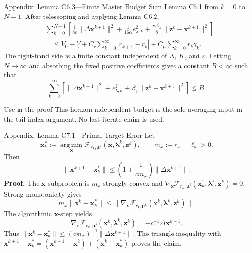 \documentclass[handout,compress,9pt]{beamer}
\newcommand{\bx}{\bm{x}}
\newcommand{\bz}{\bm{z}}
\newcommand{\bmu}{\bm{\mu}}
\newcommand{\blmbd}{\bm{\lambda}}
\newcommand{\eps}{\varepsilon}
\begin{document}
\begin{frame}{Appendix: Lemma C6.3---Finite Master Budget
\hfill\hyperlink{appendix:contents}{}}
\scriptsize
Sum Lemma C6.1 from $k=0$ to $N-1$.  After telescoping and applying
Lemma C6.2,
\begin{equation*}
\begin{aligned}
  &\sum_{k=0}^{N-1}\left[
  \frac1{8c}\|\Delta\bx^{k+1}\|^2
  +\frac1{16\alpha}e_{\lambda,k}^2
  +\frac{r_x\beta_k}{8}\|\bz^k-\bx^{k+1}\|^2\right]\\
  &\quad\le V_0-\underline V
  +C_r\sum_{k=0}^{\infty}|r_{k+1}-r_k|
  +C_\mu\sum_{k=0}^{\infty}r_k\gamma_k.
\end{aligned}
\end{equation*}
The right-hand side is a finite constant independent of $N$, $K$, and
$\eps$.  Letting $N\to\infty$ and absorbing the fixed positive coefficients
gives a constant $B<\infty$ such that
\begin{equation*}
  \sum_{k=0}^{\infty}\left[
  \|\Delta\bx^{k+1}\|^2+e_{\lambda,k}^2
  +\beta_k\|\bz^k-\bx^{k+1}\|^2\right]\le B.
\end{equation*}
\begin{block}{Use in the proof}
This horizon-independent budget is the sole averaging input in the tail-index
argument.  No last-iterate claim is used.
\end{block}
\end{frame}

\begin{frame}{Appendix: Lemma C7.1---Primal Target Error
\hfill\hyperlink{appendix:contents}{}}
\hypertarget{appendix:candidate-residual}{}
\scriptsize
Let
\begin{equation*}
  \bx_k^*:=\operatorname*{arg\,min}_{\bx}
  \mathcal F_{r_k,\bmu^k}(\bx,\blmbd^k,\bz^k),
  \qquad m_x:=r_x-\ell_\rho>0.
\end{equation*}
Then
\begin{equation*}
  \|\bx^{k+1}-\bx_k^*\|
  \le\left(1+\frac1{cm_x}\right)\|\Delta\bx^{k+1}\|.
\end{equation*}
\noindent\textbf{Proof.}
The $\bx$-subproblem is $m_x$-strongly convex and
$\nabla_{\bx}\mathcal F_{r_k,\bmu^k}(\bx_k^*,\blmbd^k,\bz^k)=0$.
Strong monotonicity gives
\begin{equation*}
  m_x\|\bx^k-\bx_k^*\|
  \le\|\nabla_{\bx}\mathcal F_{r_k,\bmu^k}
  (\bx^k,\blmbd^k,\bz^k)\|.
\end{equation*}
The algorithmic $\bx$-step yields
\begin{equation*}
  \nabla_{\bx}\mathcal F_{r_k,\bmu^k}
  (\bx^k,\blmbd^k,\bz^k)
  =-c^{-1}\Delta\bx^{k+1}.
\end{equation*}
Thus
$\|\bx^k-\bx_k^*\|\le(cm_x)^{-1}\|\Delta\bx^{k+1}\|$.
The triangle inequality with
$\bx^{k+1}-\bx_k^*=(\bx^{k+1}-\bx^k)+(\bx^k-\bx_k^*)$
proves the claim.
\end{frame}
\end{document}
